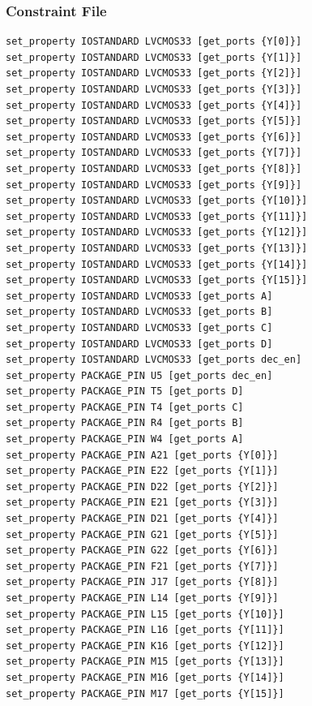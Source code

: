 \documentclass[onecolumn, oneside, ctexart]{SUSTechHomework}
\begin{document}
\subsubsection*{Constraint File}
\begin{lstlisting}
set_property IOSTANDARD LVCMOS33 [get_ports {Y[0]}]
set_property IOSTANDARD LVCMOS33 [get_ports {Y[1]}]
set_property IOSTANDARD LVCMOS33 [get_ports {Y[2]}]
set_property IOSTANDARD LVCMOS33 [get_ports {Y[3]}]
set_property IOSTANDARD LVCMOS33 [get_ports {Y[4]}]
set_property IOSTANDARD LVCMOS33 [get_ports {Y[5]}]
set_property IOSTANDARD LVCMOS33 [get_ports {Y[6]}]
set_property IOSTANDARD LVCMOS33 [get_ports {Y[7]}]
set_property IOSTANDARD LVCMOS33 [get_ports {Y[8]}]
set_property IOSTANDARD LVCMOS33 [get_ports {Y[9]}]
set_property IOSTANDARD LVCMOS33 [get_ports {Y[10]}]
set_property IOSTANDARD LVCMOS33 [get_ports {Y[11]}]
set_property IOSTANDARD LVCMOS33 [get_ports {Y[12]}]
set_property IOSTANDARD LVCMOS33 [get_ports {Y[13]}]
set_property IOSTANDARD LVCMOS33 [get_ports {Y[14]}]
set_property IOSTANDARD LVCMOS33 [get_ports {Y[15]}]
set_property IOSTANDARD LVCMOS33 [get_ports A]
set_property IOSTANDARD LVCMOS33 [get_ports B]
set_property IOSTANDARD LVCMOS33 [get_ports C]
set_property IOSTANDARD LVCMOS33 [get_ports D]
set_property IOSTANDARD LVCMOS33 [get_ports dec_en]
set_property PACKAGE_PIN U5 [get_ports dec_en]
set_property PACKAGE_PIN T5 [get_ports D]
set_property PACKAGE_PIN T4 [get_ports C]
set_property PACKAGE_PIN R4 [get_ports B]
set_property PACKAGE_PIN W4 [get_ports A]
set_property PACKAGE_PIN A21 [get_ports {Y[0]}]
set_property PACKAGE_PIN E22 [get_ports {Y[1]}]
set_property PACKAGE_PIN D22 [get_ports {Y[2]}]
set_property PACKAGE_PIN E21 [get_ports {Y[3]}]
set_property PACKAGE_PIN D21 [get_ports {Y[4]}]
set_property PACKAGE_PIN G21 [get_ports {Y[5]}]
set_property PACKAGE_PIN G22 [get_ports {Y[6]}]
set_property PACKAGE_PIN F21 [get_ports {Y[7]}]
set_property PACKAGE_PIN J17 [get_ports {Y[8]}]
set_property PACKAGE_PIN L14 [get_ports {Y[9]}]
set_property PACKAGE_PIN L15 [get_ports {Y[10]}]
set_property PACKAGE_PIN L16 [get_ports {Y[11]}]
set_property PACKAGE_PIN K16 [get_ports {Y[12]}]
set_property PACKAGE_PIN M15 [get_ports {Y[13]}]
set_property PACKAGE_PIN M16 [get_ports {Y[14]}]
set_property PACKAGE_PIN M17 [get_ports {Y[15]}]
\end{lstlisting}
\end{document}
